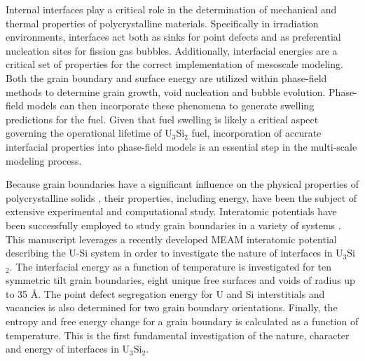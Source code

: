 \documentclass[review]{elsarticle}
\begin{document}
Internal interfaces play a critical role in the determination of mechanical and thermal properties of polycrystalline materials. Specifically in irradiation environments, interfaces act both as sinks for point defects and as preferential nucleation sites for fission gas bubbles. Additionally, interfacial energies are a critical set of properties for the correct implementation of mesoscale modeling. Both the grain boundary and surface energy are utilized within phase-field methods to determine grain growth, void nucleation and bubble evolution. Phase-field models can then incorporate these phenomena to generate swelling predictions for the fuel. Given that fuel swelling is likely a critical aspect governing the operational lifetime of U$_{3}$Si$_{2}$ fuel, incorporation of accurate interfacial properties into phase-field models is an essential step in the multi-scale modeling process.

Because grain boundaries have a significant influence on the physical properties of polycrystalline solids \cite{brandon2010, harmer2010}, their properties, including energy, have been the subject of extensive experimental and computational study. Interatomic potentials have been successfully employed to study grain boundaries in a variety of systems \cite{morita1997, wolf1989bcc1, wolf1990bcc2, ratanaphan2015, novoselov2014, tschopp2012probing, hahn2016}. This manuscript leverages a recently developed MEAM interatomic potential describing the U-Si system in order to investigate the nature of interfaces in U$_{3}$Si$_{2}$. The interfacial energy as a function of temperature is investigated for ten symmetric tilt grain boundaries, eight unique free surfaces and voids of radius up to 35 {\AA}. The point defect segregation energy for U and Si interstitials and vacancies is also determined for two grain boundary orientations. Finally, the entropy and free energy change for a grain boundary is calculated as a function of temperature. This is the first fundamental investigation of the nature, character and energy of interfaces in U$_{3}$Si$_{2}$. 
\end{document}

